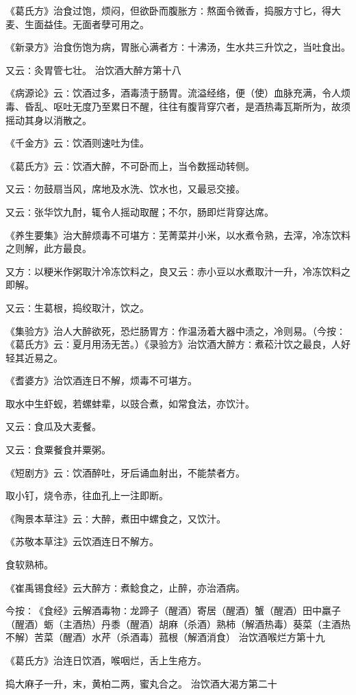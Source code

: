 \documentclass[a4paper,12pt,UTF8,twoside]{ctexbook}
\begin{document}
《葛氏方》治食过饱，烦闷，但欲卧而腹胀方∶熬面令微香，捣服方寸匕，得大麦、生面益佳。无面者孽可用之。

《新录方》治食伤饱为病，胃胀心满者方∶十沸汤，生水共三升饮之，当吐食出。

又云∶灸胃管七壮。
治饮酒大醉方第十八

《病源论》云∶饮酒过多，酒毒渍于肠胃。流溢经络，便（使）血脉充满，令人烦毒、昏乱、呕吐无度乃至累日不醒，往往有腹背穿穴者，是酒热毒瓦斯所为，故须摇动其身以消散之。

《千金方》云∶饮酒则速吐为佳。

《葛氏方》云∶饮酒大醉，不可卧而上，当令数摇动转侧。

又云∶勿鼓扇当风，席地及水洗、饮水也，又最忌交接。

又云∶张华饮九酎，辄令人摇动取醒；不尔，肠即烂背穿达席。

《养生要集》治大醉烦毒不可堪方∶芜菁菜并小米，以水煮令熟，去滓，冷冻饮料之则解，此方最良。

又方∶以粳米作粥取汁冷冻饮料之，良又云∶赤小豆以水煮取汁一升，冷冻饮料之即解。

又云∶生葛根，捣绞取汁，饮之。

《集验方》治人大醉欲死，恐烂肠胃方∶作温汤着大器中渍之，冷则易。（今按∶《葛氏方》云∶夏月用汤无苦。）《录验方》治饮酒大醉方∶煮菘汁饮之最良，人好轻其近易之。

《耆婆方》治饮酒连日不解，烦毒不可堪方。

取水中生虾蚬，若螺蚌辈，以豉合煮，如常食法，亦饮汁。

又云∶食瓜及大麦餐。

又云∶食粟餐食并粟粥。

《短剧方》云∶饮酒醉吐，牙后诵血射出，不能禁者方。

取小钉，烧令赤，往血孔上一注即断。

《陶景本草注》云∶大醉，煮田中螺食之，又饮汁。

《苏敬本草注》云饮酒连日不解方。

食软熟柿。

《崔禹锡食经》云大醉方∶煮鲶食之，止醉，亦治酒病。

今按∶《食经》云解酒毒物∶龙蹄子（醒酒）寄居（醒酒）蟹（醒酒）田中羸子（醒酒）蛎（主酒热）丹黍（醒酒）胡麻（杀酒）熟柿（解酒热毒）葵菜（主酒热不解）苦菜（醒酒）水芹（杀酒毒）菰根（解酒消食）
治饮酒喉烂方第十九

《葛氏方》治连日饮酒，喉咽烂，舌上生疮方。

捣大麻子一升，末，黄柏二两，蜜丸合之。
治饮酒大渴方第二十
\end{document}

